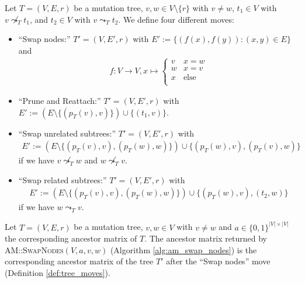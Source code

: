 \begin{definition}
    \label{def:tree_moves}
    Let $T = (V, E, r)$ be a mutation tree, $v, w \in V \setminus \{r\}$ with $v \neq w$, $t_1 \in V$ with $v \not\leadsto_T t_1$, and $t_2 \in V$ with $v \leadsto_T t_2$. We define four different moves:
    \begin{itemize}
        \item ``Swap nodes:'' $T' = (V, E', r)$ with $E' := \{(f(x), f(y)) : (x, y) \in E\}$ and
        \begin{align*}
            f: V \rightarrow V, x \mapsto \begin{cases}
                v & x = w \\
                w & x = v \\
                x & \text{else} \\
            \end{cases}
        \end{align*}
        \item ``Prune and Reattach:'' $T' = (V, E', r)$ with $E' := (E \setminus \{(p_T(v), v)\}) \cup \{(t_1, v)\}$.
        \item ``Swap unrelated subtrees:'' $T' = (V, E', r)$ with
        \begin{align*}
            E' := (E \setminus \{(p_T(v), v), (p_T(w), w)\}) \cup \{(p_T(w), v), (p_T(v), w)\}
        \end{align*}
        if we have $v \not\leadsto_T w$ and $w \not \leadsto_T v$.
        \item ``Swap related subtrees:'' $T' = (V, E', r)$ with 
        \begin{align*}
            E' := (E \setminus \{(p_T(v), v), (p_T(w), w)\}) \cup \{(p_T(w), v), (t_2, w)\}
        \end{align*}
        if we have $w \leadsto_T v$.
    \end{itemize}
\end{definition}

\begin{theorem}
    \label{theo:swap_nodes_correctness}
    Let $T = (V, E, r)$ be a mutation tree, $v, w \in V$ with $v \neq w$ and $a \in \{0,1\}^{|V| \times |V|}$ the corresponding ancestor matrix of $T$. The ancestor matrix returned by \textsc{AM::SwapNodes}$(V, a, v, w)$ (Algorithm \ref{alg:am_swap_nodes}) is the corresponding ancestor matrix of the tree $T'$ after the ``Swap nodes'' move (Definition \ref{def:tree_moves}).
\end{theorem}

